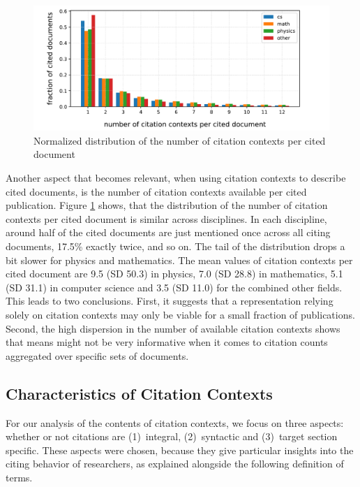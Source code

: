 \begin{figure}
  \centering
    \includegraphics[width=\textwidth]{figures/corpus/Fig8.pdf}
  \caption{Normalized distribution of the number of citation contexts per cited document}
  \label{fig:citcontextdist}
\end{figure}

Another aspect that becomes relevant, when using citation contexts to describe cited documents, is the number of citation contexts available per cited publication. Figure \ref{fig:citcontextdist} shows, that the distribution of the number of citation contexts per cited document is similar across disciplines. In each discipline, around half of the cited documents are just mentioned once across all citing documents, 17.5\% exactly twice, and so on. The tail of the distribution drops a bit slower for physics and mathematics. The mean values of citation contexts per cited document are 9.5 (SD 50.3) in physics, 7.0 (SD 28.8) in mathematics, 5.1 (SD 31.1) in computer science and 3.5 (SD 11.0) for the combined other fields. This leads to two conclusions. First, it suggests that a representation relying solely on citation contexts may only be viable for a small fraction of publications. Second, the high dispersion in the number of available citation contexts shows that means might not be very informative when it comes to citation counts aggregated over specific sets of documents.

\subsection{Characteristics of Citation Contexts}
For our analysis of the contents of citation contexts, we focus on three aspects: whether or not citations are (1)~integral, (2)~syntactic and (3)~target section specific. These aspects were chosen, because they give particular insights into the citing behavior of researchers, as explained alongside the following definition of terms.

